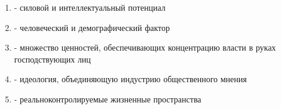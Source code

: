 \begin{enumerate}
  \item {} - силовой и интеллектуальный потенциал
  \item {} - человеческий и демографический фактор
  \item {} - множество ценностей, обеспечивающих концентрацию власти
        в руках господствующих лиц
  \item {} - идеология, объединяющую индустрию общественного
        мнения
  \item {} - реальноконтролируемые жизненные пространства
\end{enumerate}
